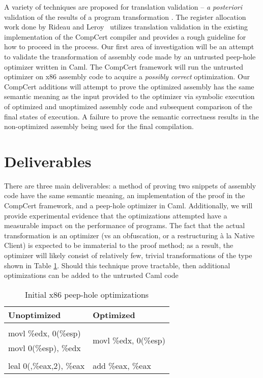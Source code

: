 \documentclass[letterpaper]{article}
\begin{document}
A variety of techniques are proposed for translation validation --
{\it a posteriori} validation of the results of a program
transformation \cite{2008-Tristan-Leroy-POPL}. The register allocation
work done by Rideau and Leroy~\cite{Rideau-Leroy-regalloc} utilizes
translation validation in the existing implementation of the CompCert
compiler and provides a rough guideline for how to proceed in the
process. Our first area of investigation will be an attempt to
validate the transformation of assembly code made by an untrusted
peep-hole optimizer written in Caml.  The CompCert framework will run
the untrusted optimizer on x86 assembly code to acquire a {\it
  possibly correct} optimization.  Our CompCert additions will attempt
to prove the optimized assembly has the same semantic meaning as the
input provided to the optimizer via symbolic execution of optimized
and unoptimized assembly code and subsequent comparison of the final
states of execution. A failure to prove the semantic correctness
results in the non-optimized assembly being used for the final
compilation.

\section{Deliverables}
There are three main deliverables: a method of proving two snippets of
assembly code have the same semantic meaning, an implementation of the
proof in the CompCert framework, and a peep-hole optimizer in
Caml. Additionally, we will provide experimental evidence that the
optimizations attempted have a measurable impact on the performance of
programs.  The fact that the actual transformation is an optimizer (vs
an obfuscation, or a restructuring \`a la Native Client) is expected
to be immaterial to the proof method; as a result, the optimizer will
likely consist of relatively few, trivial transformations of the type
shown in Table \ref{x86}.  Should this technique prove tractable, then
additional optimizations can be added to the untrusted Caml code

\begin{table}
  \caption{Initial x86 peep-hole optimizations}
  \label{x86}
  \begin{center}
  \begin{tabular}{l | l }
    Unoptimized & Optimized\\
    \hline \\
    movl    \%edx, 0(\%esp) &  \multirow{2}{*}{ movl    \%edx,
      0(\%esp)} \\
    movl    0(\%esp), \%edx & \\
    \hline \\
    leal 0(,\%eax,2), \%eax  & add \%eax,  \%eax 
  \end{tabular}
  \end{center}
\end{table}

{}

\end{document}
